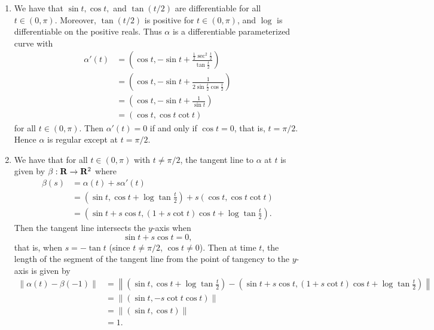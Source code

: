 \begin{ex}
\begin{enumerate}
\item We have that $\sin t, \cos t,$ and $\tan(t/2)$ are differentiable for all $t \in (0, \pi)$. Moreover, $\tan(t/2)$ is positive for $t \in (0, \pi)$, and $\log$ is differentiable on the positive reals. Thus $\alpha$ is a differentiable parameterized curve with
\begin{align*}
\alpha'(t) & = \left(\cos t, -\sin t + \frac{\frac{1}{2}\sec^2\frac{t}{2}}{\tan\frac{t}{2}}\right)\\
& = \left(\cos t, -\sin t + \frac{1}{2\sin\frac{t}{2}\cos\frac{t}{2}}\right)\\
& = \left(\cos t, -\sin t + \frac{1}{\sin t}\right)\\
& = (\cos t, \cos t\cot t)
\end{align*}
for all $t \in (0, \pi)$. Then $\alpha'(t) = 0$ if and only if $\cos t = 0$, that is, $t = \pi/2$. Hence $\alpha$ is regular except at $t = \pi/2$.

\item We have that for all $t \in (0, \pi)$ with $t\not = \pi/2$, the tangent line to $\alpha$ at $t$ is given by $\beta: \mathbf{R} \to \mathbf{R}^2$ where
\begin{align*}
\beta(s) & = \alpha(t) + s\alpha'(t)\\
& = \left(\sin t, \cos t + \log\tan\frac{t}{2}\right) + s(\cos t, \cos t\cot t)\\
& = \left(\sin t + s\cos t, (1 + s\cot t)\cos t + \log\tan\frac{t}{2}\right).
\end{align*}
Then the tangent line intersects the $y$-axis when \[\sin t + s\cos t = 0,\] that is, when $s = -\tan t$ (since $ t\not = \pi/2$, $\cos t \not = 0$). Then at time $t$, the length of the segment of the tangent line from the point of tangency to the $y$-axis is given by
\begin{align*}
\|\alpha(t) - \beta(-1)\| & = \left\|\left(\sin t, \cos t + \log\tan\frac{t}{2}\right) - \left(\sin t + s\cos t, (1 + s\cot t)\cos t + \log\tan\frac{t}{2}\right)\right\|\\
& = \|(\sin t, -s\cot t\cos t)\|\\
& = \|(\sin t, \cos t)\|\\
& = 1.
\end{align*}
\end{enumerate}
\end{ex}

